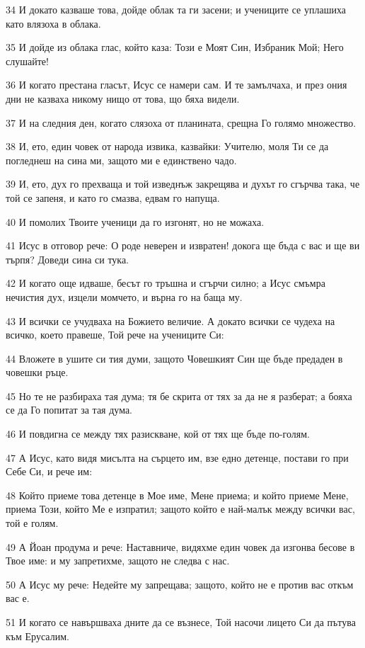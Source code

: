 \par 34 И докато казваше това, дойде облак та ги засени; и учениците се уплашиха като влязоха в облака.
\par 35 И дойде из облака глас, който каза: Този е Моят Син, Избраник Мой; Него слушайте!
\par 36 И когато престана гласът, Исус се намери сам. И те замълчаха, и през ония дни не казваха никому нищо от това, що бяха видели.
\par 37 И на следния ден, когато слязоха от планината, срещна Го голямо множество.
\par 38 И, ето, един човек от народа извика, казвайки: Учителю, моля Ти се да погледнеш на сина ми, защото ми е единствено чадо.
\par 39 И, ето, дух го прехваща и той изведнъж закрещява и духът го сгърчва така, че той се запеня, и като го смазва, едвам го напуща.
\par 40 И помолих Твоите ученици да го изгонят, но не можаха.
\par 41 Исус в отговор рече: О роде неверен и извратен! докога ще бъда с вас и ще ви търпя? Доведи сина си тука.
\par 42 И когато още идваше, бесът го тръшна и сгърчи силно; а Исус смъмра нечистия дух, изцели момчето, и върна го на баща му.
\par 43 И всички се учудваха на Божието величие. А докато всички се чудеха на всичко, което правеше, Той рече на учениците Си:
\par 44 Вложете в ушите си тия думи, защото Човешкият Син ще бъде предаден в човешки ръце.
\par 45 Но те не разбираха тая дума; тя бе скрита от тях за да не я разберат; а бояха се да Го попитат за тая дума.
\par 46 И повдигна се между тях разискване, кой от тях ще бъде по-голям.
\par 47 А Исус, като видя мисълта на сърцето им, взе едно детенце, постави го при Себе Си, и рече им:
\par 48 Който приеме това детенце в Мое име, Мене приема; и който приеме Мене, приема Този, който Ме е изпратил; защото който е най-малък между всички вас, той е голям.
\par 49 А Йоан продума и рече: Наставниче, видяхме един човек да изгонва бесове в Твое име: и му запретихме, защото не следва с нас.
\par 50 А Исус му рече: Недейте му запрещава; защото, който не е против вас откъм вас е.
\par 51 И когато се навършваха дните да се възнесе, Той насочи лицето Си да пътува към Ерусалим.
